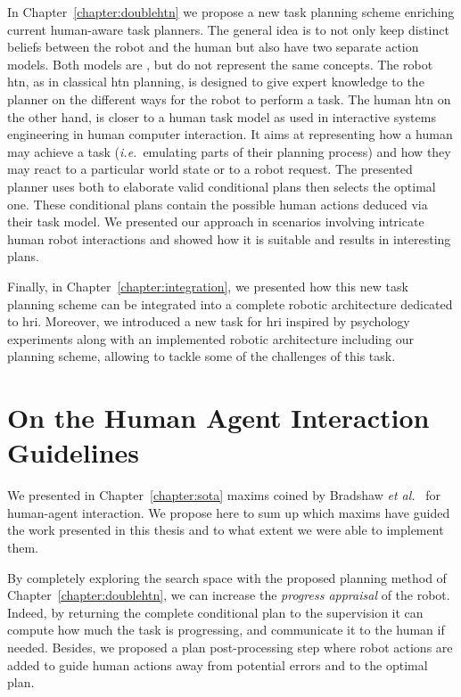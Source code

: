 \documentclass[a4paper,11pt,twoside]{StyleThese}
\begin{document}
In Chapter~\ref{chapter:doublehtn} we propose a new task planning scheme enriching current human-aware task planners. The general idea is to not only keep distinct beliefs between the robot and the human but also have two separate action models. Both models are , but do not represent the same concepts. The robot \acrshort{htn}, as in classical \acrshort{htn} planning, is designed to give expert knowledge to the planner on the different ways for the robot to perform a task. The human \acrshort{htn} on the other hand, is closer to a human task model as used in interactive systems engineering in human computer interaction. It aims at representing how a human may achieve a task (\textit{i.e.}~emulating parts of their planning process) and how they may react to a particular world state or to a robot request. The presented planner uses both  to elaborate valid conditional plans then selects the optimal one. These conditional plans contain the possible human actions deduced via their task model. We presented our approach in scenarios involving intricate human robot interactions and showed how it is suitable and results in interesting plans. 

Finally, in Chapter~\ref{chapter:integration}, we presented how this new task planning scheme can be integrated into a complete robotic architecture dedicated to \acrshort{hri}. Moreover, we introduced a new task for \acrshort{hri} inspired by psychology experiments along with an implemented robotic architecture including our planning scheme, allowing to tackle some of the challenges of this task.

\section*{On the Human Agent Interaction Guidelines}
We presented in Chapter~\ref{chapter:sota} maxims coined by Bradshaw \textit{et al.}~\cite{bradshaw2011human} for human-agent interaction. We propose here to sum up which maxims have guided the work presented in this thesis and to what extent we were able to implement them.

By completely exploring the search space with the proposed planning method of Chapter~\ref{chapter:doublehtn}, we can increase the \textit{progress appraisal} of the robot. Indeed, by returning the complete conditional plan to the supervision it can compute how much the task is progressing, and communicate it to the human if needed. Besides, we proposed a plan post-processing step where robot actions are added to guide human actions away from potential errors and to the optimal plan.
\end{document}
